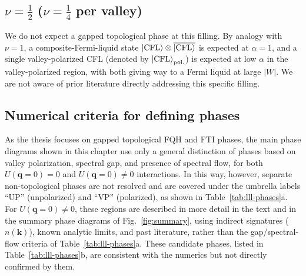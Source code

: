 \subsection{\texorpdfstring{$\nu = \tfrac{1}{2}$}{nu = 1/2} (\texorpdfstring{$\nu=\frac{1}{4}$}{nu = 1/4} per valley)}

We do not expect a gapped topological phase at this filling. By analogy with $\nu=1$, a composite-Fermi-liquid state $\ket{\text{CFL}} \otimes \overline{\ket{\text{CFL}}}$ is expected at $\alpha=1$, and a single valley-polarized CFL (denoted by $\ket{\text{CFL}}_{\text{pol.}}$) is expected at low $\alpha$ in the valley-polarized region, with both giving way to a Fermi liquid at large $|W|$. We are not aware of prior literature directly addressing this specific filling.


\subsection{Numerical criteria for defining phases}
As the thesis focuses on gapped topological FQH and FTI phases, the main phase diagrams shown in this chapter use only a general distinction of phases based on valley polarization, spectral gap, and presence of spectral flow, for both $U(\mathbf{q} = 0)=0$ and $U(\mathbf{q}=0)\neq0$ interactions. In this way, however, separate non-topological phases are not resolved and are covered under the umbrella labels ``UP'' (unpolarized) and ``VP'' (polarized), as shown in Table~\ref{tab:lll-phases}a. For $U(\mathbf{q}=0)\neq0$, these regions are described in more detail in the text and in the summary phase diagrams of Fig.~\ref{fig:summary}, using indirect signatures ($n(\mathbf{k})$), known analytic limits, and past literature, rather than the gap/spectral-flow criteria of Table~\ref{tab:lll-phases}a. These candidate phases, listed in Table~\ref{tab:lll-phases}b, are consistent with the numerics but not directly confirmed by them.

